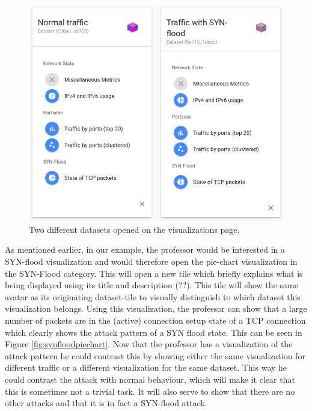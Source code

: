 \begin{figure}
    \centering
    \includegraphics[width=13cm]{images/evaluation-dataset-tiles.png}
    \caption{Two different datasets opened on the visualizations page.}
    \label{fig:datasettiles}
\end{figure}
As mentioned earlier, in our example, the professor would be interested in a SYN-flood visualization and would therefore open the pie-chart visualization in the SYN-Flood category. This will open a new tile which briefly explains what is being displayed using its title and description (??). This tile will show the same avatar as its originating dataset-tile to visually distinguish to which dataset this visualization belongs. Using this visualization, the professor can show that a large number of packets are in the (active) connection setup state of a TCP connection which clearly shows the attack pattern of a SYN flood state. This can be seen in Figure \ref{fig:synfloodpiechart}. Now that the professor has a visualization of the attack pattern he could contrast this by showing either the same visualization for different traffic or a different visualization for the same dataset. This way he could contrast the attack with normal behaviour, which will make it clear that this is sometimes not a trivial task. It will also serve to show that there are no other attacks and that it is in fact a SYN-flood attack.

